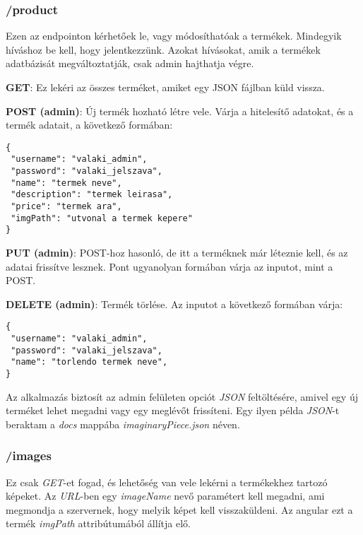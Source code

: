\documentclass[]{article}
\begin{document}
\subsubsection{/product}

Ezen az endpointon kérhetőek le, vagy módosíthatóak a termékek. Mindegyik híváshoz be kell, hogy jelentkezzünk. Azokat hívásokat, amik a termékek adatbázisát megváltoztatják, csak admin hajthatja végre.

\noindent
\textbf{GET}: Ez lekéri az összes terméket, amiket egy JSON fájlban küld vissza.

\noindent
\textbf{POST (admin)}: Új termék hozható létre vele. Várja a hitelesítő adatokat, és a termék adatait, a következő formában:

\bigskip
\begin{lstlisting}
{
 "username": "valaki_admin",
 "password": "valaki_jelszava",
 "name": "termek neve",
 "description": "termek leirasa",
 "price": "termek ara",
 "imgPath": "utvonal a termek kepere"
}
\end{lstlisting}

\bigskip
\noindent
\textbf{PUT (admin)}: POST-hoz hasonló, de itt a terméknek már léteznie kell, és az adatai frissítve lesznek. Pont ugyanolyan formában várja az inputot, mint a POST.

\noindent
\textbf{DELETE (admin)}: Termék törlése. Az inputot a következő formában várja:

\bigskip
\begin{lstlisting}
{
 "username": "valaki_admin",
 "password": "valaki_jelszava",
 "name": "torlendo termek neve",
}
\end{lstlisting}

Az alkalmazás biztosít az admin felületen opciót \textit{JSON} feltöltésére, amivel egy új terméket lehet megadni vagy egy meglévőt frissíteni. Egy ilyen példa \textit{JSON}-t beraktam a \textit{docs} mappába \textit{imaginaryPiece.json} néven.

\subsubsection{/images}

Ez csak \textit{GET}-et fogad, és lehetőség van vele lekérni a termékekhez tartozó képeket. Az \textit{URL}-ben egy \textit{imageName} nevő paramétert kell megadni, ami megmondja a szervernek, hogy melyik képet kell visszaküldeni. Az angular ezt a termék \textit{imgPath} attribútumából állítja elő. 
\end{document}
